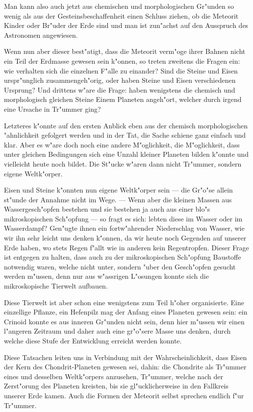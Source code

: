 \documentclass[a4paper, 11pt, oneside]{article}
\begin{document}
Man kann also auch jetzt aus chemischen und morphologischen Gr"unden so wenig als aus der Gesteinsbeschaffenheit einen Schluss ziehen, ob die Meteorit Kinder oder Br"uder der Erde sind und man ist zun"achst auf den Ausspruch des Astronomen angewiesen.

Wenn nun aber dieser best"atigt, dass die Meteorit verm"oge ihrer Bahnen nicht ein Teil der Erdmasse gewesen sein k"onnen, so treten zweitens die Fragen ein: wie verhalten sich die einzelnen F"alle zu einander? Sind die Steine und Eisen urspr"unglich zusammengeh"orig, oder haben Steine und Eisen verschiedenen Ursprung? Und drittens w"are die Frage: haben wenigstens die chemisch und morphologisch gleichen Steine Einem Planeten angeh"ort, welcher durch irgend eine Ursache in Tr"ummer ging?

Letzteres k"onnte auf den ersten Anblick eben aus der chemisch morphologischen "ahnlichkeit gefolgert werden und in der Tat, die Sache schiene ganz einfach und klar. Aber es w"are doch noch eine andere M"oglichkeit, die M"oglichkeit, dass unter gleichen Bedingungen sich eine Unzahl kleiner Planeten bilden k"onnte und vielleicht heute noch bildet. Die St"ucke w"aren dann nicht Tr"ummer, sondern eigene Weltk"orper.

Eisen und Steine k"onnten nun eigene Weltk"orper sein --- die Gr"o"se allein st"unde der Annahme nicht im Wege. --- Wenn aber die kleinen Massen aus Wassergesch"opfen bestehen und sie bestehen ja auch aus einer blo"s mikroskopischen Sch"opfung --- so fragt es sich: lebten diese im Wasser oder im Wasserdampf? Gen"ugte ihnen ein fortw"ahrender Niederschlag von Wasser, wie wir ihn sehr leicht uns denken k"onnen, da wir heute noch Gegenden auf unserer Erde haben, wo stets Regen f"allt wie in anderen kein Regentropfen. Dieser Frage ist entgegen zu halten, dass auch zu der mikroskopischen Sch"opfung Baustoffe notwendig waren, welche nicht unter, sondern "uber den Gesch"opfen gesucht werden m"ussen, denn nur aus w"assrigen L"osungen konnte sich die mikroskopische Tierwelt aufbauen.

Diese Tierwelt ist aber schon eine wenigstens zum Teil h"oher organisierte. Eine einzellige Pflanze, ein Hefenpilz mag der Anfang eines Planeten gewesen sein: ein Crinoid konnte es aus inneren Gr"unden nicht sein, denn hier m"ussen wir einen l"angeren Zeitraum und daher auch eine gr"o"sere Masse uns denken, durch welche diese Stufe der Entwicklung erreicht werden konnte.

Diese Tatsachen leiten uns in Verbindung mit der Wahrscheinlichkeit, dass Eisen der Kern des Chondrit-Planeten gewesen sei, dahin: die Chondrite als Tr"ummer eines und desselben Weltk"orpers anzusehen, Tr"ummer, welche nach der Zerst"orung des Planeten kreisten, bis sie gl"ucklicherweise in den Fallkreis unserer Erde kamen. Auch die Formen der Meteorit selbst sprechen endlich f"ur Tr"ummer.
\end{document}
